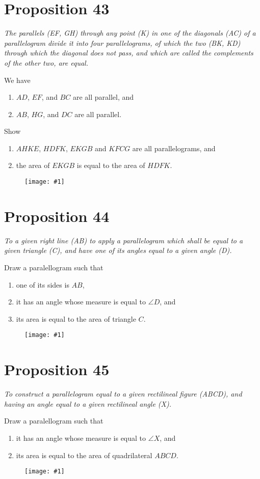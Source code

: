 \documentclass[openany]{book}
\newcommand{\diagram}[1]{
    \vspace*{\fill}
    \begin{figure}[H]
        \centering
        \texttt{[image: \#1]}
    \end{figure}
    \vspace*{\fill}
}
\newenvironment{proposition}
    {\begin{center}\em}
    {\end{center}}
\begin{document}
    \section{Proposition 43}
    \begin{proposition}
    The parallels (EF, GH) through any point (K) in one of the diagonals (AC) of a parallelogram divide it into four
    parallelograms, of which the two (BK, KD) through which the diagonal does not pass, and which are called the
    complements of the other two, are equal.
    \end{proposition}
    We have
    \begin{enumerate}
        \item $AD$, $EF$, and $BC$ are all parallel, and
        \item $AB$, $HG$, and $DC$ are all parallel.
    \end{enumerate}
    Show
    \begin{enumerate}
        \item $AHKE$, $HDFK$, $EKGB$ and $KFCG$ are all parallelograms, and
        \item the area of $EKGB$ is equal to the area of $HDFK$.
    \end{enumerate}
    \diagram{prop43.pdf}


    \clearpage
    \section{Proposition 44}
    \begin{proposition}
    To a given right line (AB) to apply a parallelogram which shall be equal to a given triangle (C), and have one of
    its angles equal to a given angle (D).
    \end{proposition}
    Draw a paralellogram such that
    \begin{enumerate}
        \item one of its sides is $AB$,
        \item it has an angle whose measure is equal to $\angle{D}$, and
        \item its area is equal to the area of triangle $C$.
    \end{enumerate}
    \diagram{prop44.pdf}


    \clearpage
    \section{Proposition 45}
    \begin{proposition}
    To construct a parallelogram equal to a given rectilineal figure (ABCD), and having an angle equal to a given
    rectilineal angle (X).
    \end{proposition}
    Draw a paralellogram such that
    \begin{enumerate}
        \item it has an angle whose measure is equal to $\angle{X}$, and
        \item its area is equal to the area of quadrilateral $ABCD$.
    \end{enumerate}
    \diagram{prop45.pdf}
\end{document}
